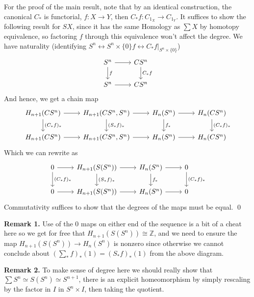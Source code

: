 \documentclass[11pt]{article}
\theoremstyle{definition}
\newcommand{\set}[1]{\{#1\}}
\begin{document}
    For the proof of the main result, note that by an identical construction, the canonical \(C_*\) is functorial, \(f: X \to Y\), then \(C_*f : C_{1_X} \to C_{1_Y}\). It suffices to show the following result for \(SX\), since it has the same Homology as \(\sum X\) by homotopy equivalence, so factoring \(f\) through this equivalence won't affect the degree. We have naturality (identifying \(S^n \leftrightarrow S^n \times \set{0} f \leftrightarrow C_*f \vert_{S^n \times \set{0}}\))
    \begin{equation*}
        \begin{tikzcd}
            S^n \arrow[d,"{f}"] \arrow[r]& CS^n\arrow[d,"{C_*f}"]\\
            S^n \arrow[r]& CS^n 
        \end{tikzcd}
    \end{equation*}
    And hence, we get a chain map
    \begin{equation*}
        \begin{tikzcd}
            H_{n+1}(CS^n) \arrow[d,"{(C_*f)_*}"] \arrow[r,"{}"]& H_{n+1}(CS^n,S^n) \arrow[d,"{(S_*f)_*}"]\arrow[r,"{}"]& H_n(S^n)\arrow[d,"{f_*}"] \arrow[r,"{}"]& H_n(CS^n) \arrow[d,"{(C_*f)_*}"] \\
            H_{n+1}(CS^n)\arrow[r,"{}"]& H_{n+1}(CS^n,S^n) \arrow[r,"{}"]& H_n(S^n) \arrow[r,"{}"]& H_n(CS^n)
        \end{tikzcd}
    \end{equation*}
    Which we can rewrite as
    \begin{equation*}
        \begin{tikzcd}
            0 \arrow[d,"{(C_*f)_*}"] \arrow[r,"{}"]& H_{n+1}(S(S^n)) \arrow[d,"{(S_*f)_*}"]\arrow[r,"{}"]& H_n(S^n)\arrow[d,"{f_*}"] \arrow[r,"{}"]& 0 \arrow[d,"{(C_*f)_*}"] \\
            0\arrow[r,"{}"]& H_{n+1}(S(S^n)) \arrow[r,"{}"]& H_n(S^n) \arrow[r,"{}"]& 0
        \end{tikzcd}
    \end{equation*}
    Commutativity suffices to show that the degrees of the maps must be equal. \qed
    
    \textbf{Remark 1.} Use of the \(0\) maps on either end of the sequence is a bit of a cheat here so we get for free that \(H_{n+1}(S(S^n)) \cong \mathbb{Z}\), and we need to ensure the map \(H_{n+1}(S(S^n)) \to H_n(S^n)\) is nonzero since otherwise we cannot conclude about \((\sum_*f)_*(1) = (S_*f)_*(1)\) from the above diagram.

    \textbf{Remark 2.} To make sense of degree here we should really show that \(\sum S^n \simeq S(S^n) \simeq S^{n+1}\), there is an explicit homeomorphism by simply rescaling by the factor in \(I\) in \(S^n \times I\), then taking the quotient.
\end{document}
